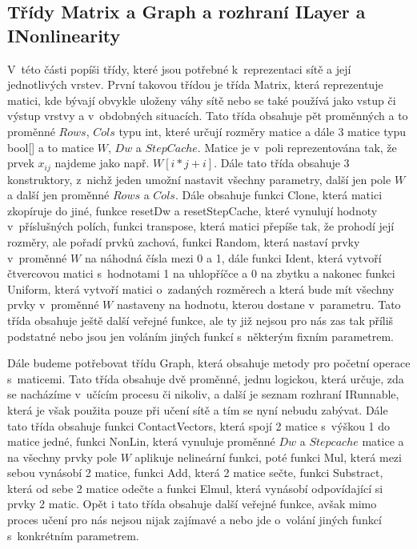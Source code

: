 \documentclass[a4paper]{article}
\begin{document}
\subsection{Třídy Matrix a Graph a rozhraní ILayer a INonlinearity}
V~této části popíši třídy, které jsou potřebné k~reprezentaci sítě a její jednotlivých vrstev. První takovou třídou je třída Matrix, která reprezentuje matici, kde bývají obvykle uloženy váhy sítě nebo se také používá jako vstup či výstup vrstvy a v~obdobných situacích. Tato třída obsahuje pět proměnných a to proměnné $Rows$, $Cols$ typu int, které určují rozměry matice a dále 3 matice typu bool[] a to matice $W$, $Dw$ a $StepCache$. Matice je v~poli reprezentována tak, že prvek $x_{ij}$ najdeme jako např. $W[i*j + i]$. Dále tato třída obsahuje 3 konstruktory, z~nichž jeden umožní nastavit všechny parametry, další jen pole $W$ a další jen proměnné $Rows$ a $Cols$. Dále obsahuje funkci Clone, která matici zkopíruje do jiné, funkce resetDw a resetStepCache, které vynulují hodnoty v~příslušných polích, funkci transpose, která matici přepíše tak, že prohodí její rozměry, ale pořadí prvků zachová, funkci Random, která nastaví prvky v~proměnné $W$ na náhodná čísla mezi 0 a 1, dále funkci Ident, která vytvoří čtvercovou matici s~hodnotami 1 na uhlopříčce a 0 na zbytku a nakonec funkci Uniform, která vytvoří matici o~zadaných rozměrech a která bude mít všechny prvky v~proměnné $W$ nastaveny na hodnotu, kterou dostane v~parametru. Tato třída obsahuje ještě další veřejné funkce, ale ty již nejsou pro nás zas tak příliš podstatné nebo jsou jen voláním jiných funkcí s~některým fixním parametrem.\par
Dále budeme potřebovat třídu Graph, která obsahuje metody pro početní operace s~maticemi. Tato třída obsahuje dvě proměnné, jednu logickou, která určuje, zda se nacházíme v~učícím procesu či nikoliv, a další je seznam rozhraní IRunnable, která je však použita pouze při učení sítě a tím se nyní nebudu zabývat. Dále tato třída obsahuje funkci ContactVectors, která spojí 2 matice s~výškou 1 do matice jedné, funkci NonLin, která vynuluje proměnné $Dw$ a $Stepcache$ matice a na všechny prvky pole $W$ aplikuje nelineární funkci, poté funkci Mul, která mezi sebou vynásobí 2 matice, funkci Add, která 2 matice sečte, funkci Substract, která od sebe 2 matice odečte a funkci Elmul, která vynásobí odpovídající si prvky 2 matic. Opět i tato třída obsahuje další veřejné funkce, avšak mimo proces učení pro nás nejsou nijak zajímavé a nebo jde o~volání jiných funkcí s~konkrétním parametrem.\par
\end{document}
